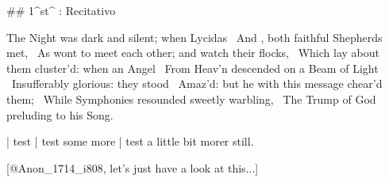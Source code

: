 \newpage
{}

## 1^st^ \mvmt: Recitativo

\beginnumbering
\pstart
The Night was dark and silent; when Lycidas  \
And , both faithful Shepherds met,  \
As wont to meet each other; and watch their flocks,  \
Which lay about them cluster’d: when an Angel  \
From Heav’n descended on a Beam of Light  \
Insufferably glorious: they stood  \
Amaz’d: but he with this message chear’d them;  \
While Symphonies resounded sweetly warbling,  \
The Trump of God preluding to his Song.
\pend
\endnumbering

| test
| test some more
| test a little bit morer still.

\vspace*{\stretch{1}}
[@Anon_1714_i808, let's just have a look at this...]
